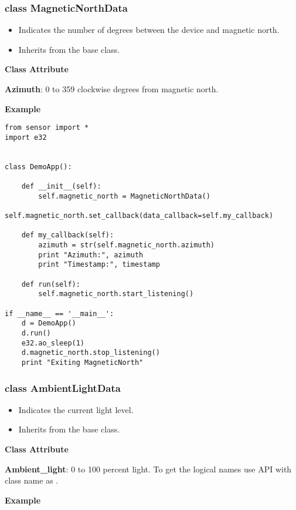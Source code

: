 \subsubsection{class MagneticNorthData}

\begin{itemize}
\item Indicates the number of degrees between the device and magnetic north.
\item Inherits from the  base class.
\end{itemize}

{\bf Class Attribute} \break

{\bf Azimuth}: 0 to 359 clockwise degrees from magnetic north.

{\bf Example} \break

\begin{verbatim}
from sensor import *
import e32


class DemoApp():

    def __init__(self):
        self.magnetic_north = MagneticNorthData()
        self.magnetic_north.set_callback(data_callback=self.my_callback)

    def my_callback(self):
        azimuth = str(self.magnetic_north.azimuth)
        print "Azimuth:", azimuth
        print "Timestamp:", timestamp

    def run(self):
        self.magnetic_north.start_listening()

if __name__ == '__main__':
    d = DemoApp()
    d.run()
    e32.ao_sleep(1)
    d.magnetic_north.stop_listening()
    print "Exiting MagneticNorth"
\end{verbatim}

\subsubsection{class AmbientLightData}

\begin{itemize}
\item Indicates the current light level.
\item Inherits from the  base class.
\end{itemize}

{\bf Class Attribute} \break

{\bf Ambient_light}: 0 to 100 percent light. To get the logical names use  API with class name as .

{\bf Example} \break

